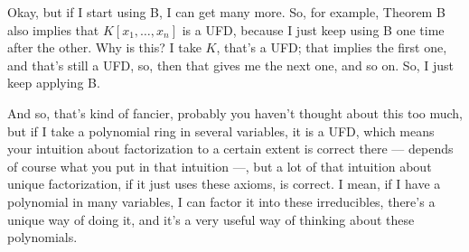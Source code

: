 \begin{content}

\end{content}

\begin{speech}[00:20:20 - 00:22:15]
Okay, but if I start using B, I can get many more. So, for example,  Theorem B also implies that $K[x_1, \dots, x_n]$  is a UFD, because I just keep using B one time after the other. Why is this? I take $K$, that's a UFD; that implies the first one, and that's still a UFD, so, then that gives me the next one,  and so on. So, I just keep applying B.

And so, that's kind of fancier, probably you haven't thought about this too much, but if I take a polynomial ring in several variables, it is a UFD, which means your intuition about factorization to a certain extent is correct there --- depends of course what you put in that intuition ---, but a lot of that intuition about unique factorization, if it just uses these axioms, is correct. I mean, if I have a polynomial in many variables, I can factor it into these irreducibles, there's a unique way of doing it, and it's a very useful way of thinking about these polynomials.
\end{speech}

